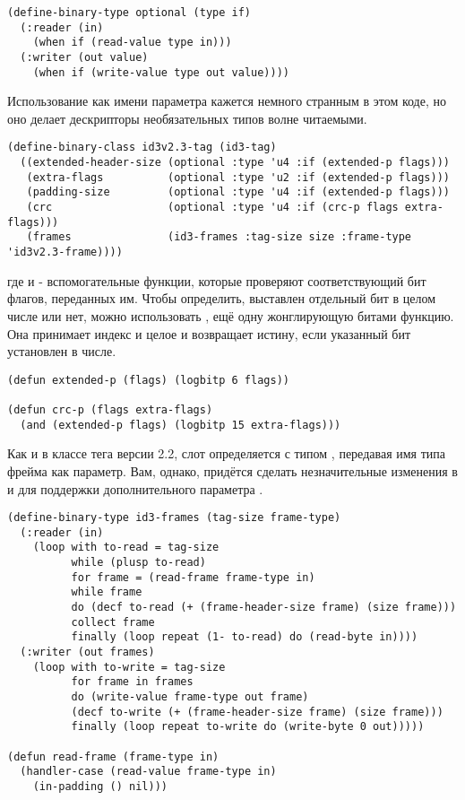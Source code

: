 \begin{lstlisting}
(define-binary-type optional (type if)
  (:reader (in)
    (when if (read-value type in)))
  (:writer (out value)
    (when if (write-value type out value))))
\end{lstlisting}

Использование  как имени параметра кажется немного странным в этом коде, но оно
делает дескрипторы необязательных типов волне читаемыми.

\begin{lstlisting}
(define-binary-class id3v2.3-tag (id3-tag)
  ((extended-header-size (optional :type 'u4 :if (extended-p flags)))
   (extra-flags          (optional :type 'u2 :if (extended-p flags)))
   (padding-size         (optional :type 'u4 :if (extended-p flags)))
   (crc                  (optional :type 'u4 :if (crc-p flags extra-flags)))
   (frames               (id3-frames :tag-size size :frame-type 'id3v2.3-frame))))
\end{lstlisting}

где  и  - вспомогательные функции, которые проверяют
соответствующий бит флагов, переданных им. Чтобы определить, выставлен отдельный бит в
целом числе или нет, можно использовать , ещё одну жонглирующую битами
функцию. Она принимает индекс и целое и возвращает истину, если указанный бит установлен в
числе.

\begin{lstlisting}
(defun extended-p (flags) (logbitp 6 flags))

(defun crc-p (flags extra-flags)
  (and (extended-p flags) (logbitp 15 extra-flags)))
\end{lstlisting}

Как и в классе тега версии 2.2, слот  определяется с типом ,
передавая имя типа фрейма как параметр. Вам, однако, придётся сделать незначительные
изменения в  и  для поддержки дополнительного параметра
.

\begin{lstlisting}
(define-binary-type id3-frames (tag-size frame-type)
  (:reader (in)
    (loop with to-read = tag-size
          while (plusp to-read)
          for frame = (read-frame frame-type in)
          while frame
          do (decf to-read (+ (frame-header-size frame) (size frame)))
          collect frame
          finally (loop repeat (1- to-read) do (read-byte in))))
  (:writer (out frames)
    (loop with to-write = tag-size
          for frame in frames
          do (write-value frame-type out frame)
          (decf to-write (+ (frame-header-size frame) (size frame)))
          finally (loop repeat to-write do (write-byte 0 out)))))

(defun read-frame (frame-type in)
  (handler-case (read-value frame-type in)
    (in-padding () nil)))
\end{lstlisting}

